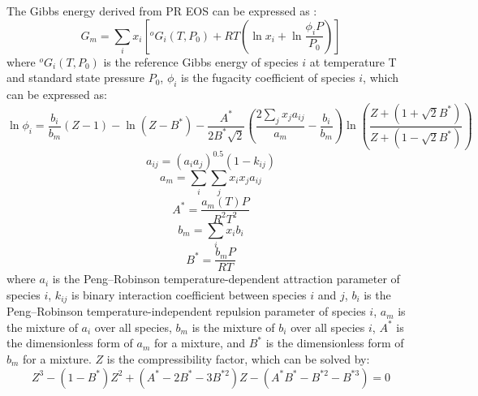 The Gibbs energy derived from PR EOS can be expressed as \cite{tang2005supercritical}:
\begin{equation} \label{models:eq:PRGm}
    G_m=\sum_i{x_i\left[^{o}G_i(T, P_0)+RT\left(\ln{x_i}+\ln{\frac{\phi_iP}{P_0}}\right)\right]}
\end{equation}
where $^{o}G_i(T, P_0)$ is the reference Gibbs energy of species $i$ at temperature T and standard state pressure $P_0$, $\phi_i$ is the fugacity coefficient of species $i$, which can be expressed as:
\begin{equation} \label{models:eq:PRphi}
    \ln{\phi_i}=\frac{b_i}{b_m}(Z-1)-\ln{(Z-B^*)}-\frac{A^*}{2B^*\sqrt{2}}\left(\frac{2\sum_jx_ja_{ij}}{a_m}-\frac{b_i}{b_m}\right)\ln{\left(\frac{Z+(1+\sqrt{2}B^*)}{Z+(1-\sqrt{2}B^*)}\right)}
\end{equation}
\begin{equation} \label{models:eq:PRaij}
    a_{ij}=(a_ia_j)^{0.5}(1-k_{ij})
\end{equation}
\begin{equation} \label{models:eq:PRam}
    a_m=\sum_i\sum_jx_ix_ja_{ij}
\end{equation} 
\begin{equation} \label{models:eq:PRAs}
    A^*=\frac{a_m(T)P}{R^2T^2}
\end{equation}
\begin{equation} \label{models:eq:PRbm}
    b_m=\sum_ix_ib_i
\end{equation} 
\begin{equation} \label{models:eq:PRBs}
    B^*=\frac{b_mP}{RT}
\end{equation}
where $a_i$ is the Peng–Robinson temperature-dependent attraction parameter of species $i$, $k_{ij}$ is binary interaction coefficient between species $i$ and $j$, $b_i$ is the Peng–Robinson temperature-independent repulsion parameter of species $i$, $a_m$ is the mixture of $a_i$ over all species, $b_m$ is the mixture of $b_i$ over all species $i$, $A^*$ is the dimensionless form of $a_m$ for a mixture, and $B^*$ is the dimensionless form of $b_m$ for a mixture. $Z$ is the compressibility factor, which can be solved by:
\begin{equation} \label{models:eq:PRZ}
    Z^3-(1-B^*)Z^2+(A^*-2B^*-3B^{*2})Z-(A^*B^*-B^{*2}-B^{*3})=0
\end{equation}

